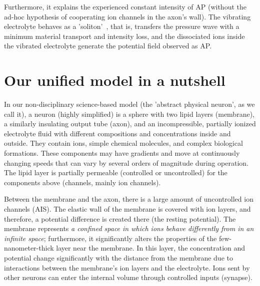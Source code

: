 Furthermore, it explains the experienced constant intensity
of \gls{AP} (without the ad-hoc hypothesis of cooperating
ion channels in the axon's wall). The vibrating electrolyte 
behaves as a 'soliton'~\cite{SolitonPropagation:2005}, that is, transfers the pressure wave with a minimum material transport and intensity loss, and the dissociated ions inside the vibrated electrolyte generate the potential field observed as \gls{AP}.


\section[Unified model
]{Our unified model in a nutshell\label{sec:Single-Nutshell}}



In our non-disciplinary science-based model (the 'abstract physical neuron', as we call it), a neuron (highly simplified) is a sphere with two lipid layers (membrane), a similarly insulating output tube (axon), and an incompressible, partially ionized electrolyte fluid with different compositions and concentrations inside and outside.
They contain ions, simple chemical molecules, and complex biological formations.
These components  may have gradients and move at continuously changing speeds that can vary by several orders of magnitude during operation. 
The lipid layer is partially permeable (controlled or uncontrolled) for the components above (channels, mainly ion channels).

Between the membrane and the axon, there is a large amount of uncontrolled ion channels (\gls{AIS}). 
The elastic wall of the membrane is covered with ion layers, and therefore, a potential difference is created there (the resting potential).
The membrane represents \textit{a confined space in which ions behave differently from in an infinite space}; furthermore, it significantly alters the properties of the few-nanometer-thick layer near the membrane. In this layer, the concentration and potential change significantly with the distance from the membrane due to interactions between the membrane's ion layers and the electrolyte.
Ions sent by other neurons can enter the internal volume through controlled inputs (synapse).

